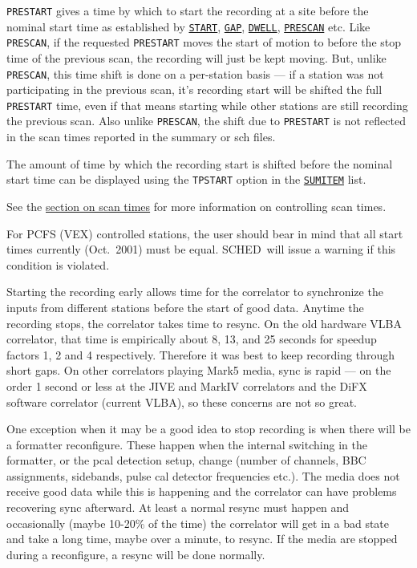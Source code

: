 \documentclass{report}
\newcommand{\schedb}{{\sc SCHED~}}
\begin{document}
{\tt PRESTART} gives a time by which to start the recording at a
site before the nominal start time as established by 
{\hyperref[MP:START]{{\tt START}}}, 
{\hyperref[MP:GAP]{{\tt GAP}}}, 
{\hyperref[MP:DWELL]{{\tt DWELL}}}, 
{\hyperref[MP:PRESCAN]{{\tt PRESCAN}}} etc.  Like {\tt
PRESCAN}, if the requested {\tt PRESTART} moves the start of motion to
before the stop time of the previous scan, the recording will just be kept
moving.  But, unlike {\tt PRESCAN}, this time shift is done on a
per-station basis --- if a station was not participating in the
previous scan, it's recording start will be shifted the full
{\tt PRESTART} time, even if that means starting while other stations
are still recording the previous scan.  Also unlike {\tt PRESCAN},
the shift due to {\tt PRESTART} is not reflected in the scan
times reported in the summary or sch files.

The amount of time by which the recording start is shifted before
the nominal start time can be displayed using the {\tt TPSTART} option
in the 
{\hyperref[MP:SUMITEM]{{\tt SUMITEM}}} list.

See the 
{\hyperref[SSEC:SCANTIMES]{section on scan times}} for more
information on controlling scan times.

For PCFS (VEX) controlled stations, the user should bear in mind that
all start times currently (Oct.\ 2001) must be equal. \schedb will issue
a warning if this condition is violated.

Starting the recording early allows time for the correlator to
synchronize the inputs from different stations before the start of
good data.  Anytime the recording stops, the correlator takes time to
resync.  On the old hardware VLBA correlator, that time is empirically
about 8, 13, and 25 seconds for speedup factors 1, 2 and 4
respectively.  Therefore it was best to keep recording through short
gaps.  On other correlators playing Mark5 media, sync is rapid ---
on the order 1 second or less at the JIVE and MarkIV correlators and the
DiFX software correlator (current VLBA), so these concerns are not so
great.

One exception when it may be a good idea to stop recording is when
there will be a formatter reconfigure.  These happen when the internal
switching in the formatter, or the pcal detection setup, change
(number of channels, BBC assignments, sidebands, pulse cal detector
frequencies etc.).  The media does not receive good data while this is
happening and the correlator can have problems recovering sync afterward.
At least a normal resync must happen and occasionally (maybe 10-20\%
of the time) the correlator will get in a bad state and take a long time,
maybe over a minute, to resync.  If the media are stopped during a
reconfigure, a resync will be done normally.
\end{document}
